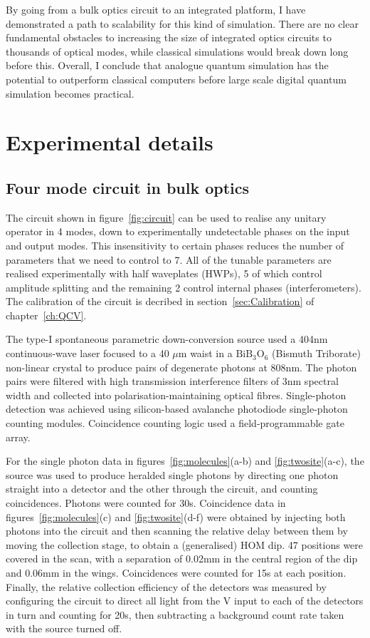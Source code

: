 By going from a bulk optics circuit to an integrated platform, I have
demonstrated a path to scalability for this kind of simulation. There are no
clear fundamental obstacles to increasing the size of integrated optics circuits
to thousands of optical modes, while classical simulations would break down long
before this. Overall, I conclude that analogue quantum simulation has the
potential to outperform classical computers before large scale digital quantum
simulation becomes practical.

\section{Experimental details}
\label{sec:SimulationExperiment}
\subsection{Four mode circuit in bulk optics}
The circuit shown in figure~\ref{fig:circuit} can be used to realise any
unitary operator in 4 modes, down to experimentally undetectable phases on the
input and output modes. This insensitivity to certain phases reduces the number
of parameters that we need to control to 7. All of the tunable parameters are
realised experimentally with half waveplates (HWPs), 5 of which control
amplitude splitting and the remaining 2 control internal phases
(interferometers). The calibration of the circuit is decribed in
section~\ref{sec:Calibration} of chapter~\ref{ch:QCV}.

The type-I spontaneous parametric down-conversion source used a 404nm
continuous-wave laser focused to a 40 \(\mu\)m waist in a \(\text{BiB}_3
\text{O}_6\) (Bismuth Triborate) non-linear crystal to produce pairs of
degenerate photons at 808nm. The photon pairs were filtered with high
transmission interference filters of 3nm spectral width and collected into
polarisation-maintaining optical fibres. Single-photon detection was achieved
using silicon-based avalanche photodiode single-photon counting modules.
Coincidence counting logic used a field-programmable gate array.

For the single photon data in figures~\ref{fig:molecules}(a-b) and
\ref{fig:twosite}(a-c), the source was used to produce heralded single photons
by directing one photon straight into a detector and the other through the
circuit, and counting coincidences. Photons were counted for 30s. Coincidence
data in figures~\ref{fig:molecules}(c) and \ref{fig:twosite}(d-f) were obtained
by injecting both photons into the circuit and then scanning the relative delay
between them by moving the collection stage, to obtain a (generalised) HOM dip.
47 positions were covered in the scan, with a separation of 0.02mm in the
central region of the dip and 0.06mm in the wings. Coincidences were counted for
15s at each position. Finally, the relative collection efficiency of the
detectors was measured by configuring the circuit to direct all light from the
V input to each of the detectors in turn and counting for 20s, then subtracting
a background count rate taken with the source turned off.

